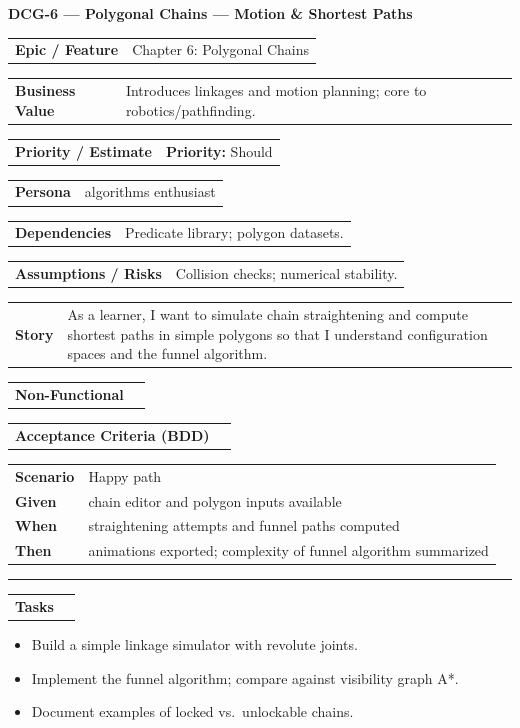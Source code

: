 \documentclass[11pt,a4paper]{article}
\makeatletter
\newcommand{\FieldRow}[2]{%
  \noindent\begin{tabularx}{\linewidth}{@{}>{\bfseries}l X@{}}#1 & #2\\\end{tabularx}%
}
\newcommand{\CardDivider}{\par\noindent\color{CardBorder}\rule{\linewidth}{0.4pt}\par\noindent\color{black}}
\newcommand{\StoryHeader}[2]{%
  {\large\bfseries \textcolor{CardTitle}{#1} --- #2}
}
\newcommand{\BDD}[4]{%
  \FieldRow{Acceptance Criteria (BDD)}{}
  \vspace{-0.75\baselineskip}
  \begin{tabularx}{\linewidth}{@{}>{\bfseries}l X@{}}
  Scenario & #1\\
  Given & #2\\
  When & #3\\
  Then & #4\\
  \end{tabularx}
}
\newenvironment{TaskList}{%
  \begin{itemize}[leftmargin=1.25em,label=\(\square\)]
}{\end{itemize}}
\makeatother
\begin{document}
\begin{StoryCardBox}
\StoryHeader{DCG-6}{Polygonal Chains — Motion \& Shortest Paths}\\[0.4em]
\FieldRow{Epic / Feature}{Chapter 6: Polygonal Chains}
\FieldRow{Business Value}{Introduces linkages and motion planning; core to robotics/pathfinding.}
\FieldRow{Priority / Estimate}{\textbf{Priority:} Should \quad \nfchip{SP: 5}}
\FieldRow{Persona}{algorithms enthusiast}
\FieldRow{Dependencies}{Predicate library; polygon datasets.}
\FieldRow{Assumptions / Risks}{Collision checks; numerical stability.}
\FieldRow{Story}{As a learner, I want to simulate chain straightening and compute shortest paths in simple polygons so that I understand configuration spaces and the funnel algorithm.}

\FieldRow{Non-Functional}{\nfchip{Clarity} \nfchip{Performance} \nfchip{Reproducibility}}

\BDD{Happy path}{chain editor and polygon inputs available}{straightening attempts and funnel paths computed}{animations exported; complexity of funnel algorithm summarized}

\CardDivider
\FieldRow{\large Tasks}{}
\begin{TaskList}
  \item Build a simple linkage simulator with revolute joints.
  \item Implement the funnel algorithm; compare against visibility graph A*.
  \item Document examples of locked vs.\ unlockable chains.
\end{TaskList}
\end{StoryCardBox}
\end{document}
